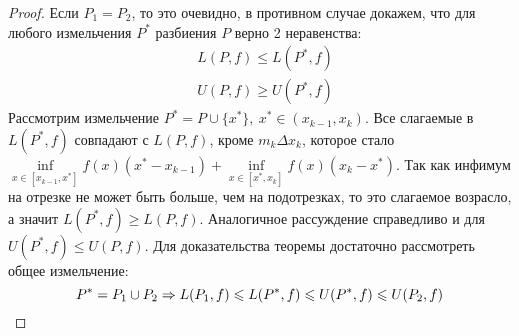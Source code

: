 \begin{proof}
	Если $P_1 = P_2$, то это очевидно, в противном случае докажем, что для любого измельчения $P^*$ разбиения $P$ верно 2 неравенства:
	\begin{align*}
		&{L(P, f) \le L(P^*, f)}
		\\
		&{U(P, f) \ge U(P^*, f)}
	\end{align*}
	Рассмотрим измельчение $P^* = P \cup \{x^*\},\ x^* \in (x_{k - 1}, x_k)$.
	Все слагаемые в $L(P^*, f)$ совпадают с $L(P, f)$, кроме $m_k \Delta x_k$, которое стало $\inf\limits_{x\in [x_{k - 1}, x^*]} f(x)(x^* - x_{k - 1}) + \inf\limits_{x\in[x^*, x_k]}f(x)(x_k - x^*)$. Так как инфимум на отрезке не может быть больше, чем на подотрезках, то это слагаемое возрасло, а значит $L(P^*, f) \geq L(P, f)$. Аналогичное рассуждение справедливо и для $U(P^*, f) \leq U(P, f)$. Для доказательства теоремы достаточно рассмотреть общее измельчение:
	\[
		P^* = P_1 \cup P_2 \Rightarrow L(P_1, f) \leqslant L(P^*, f) \leqslant U(P^*, f) \leqslant U(P_2, f)
	\]
\end{proof}